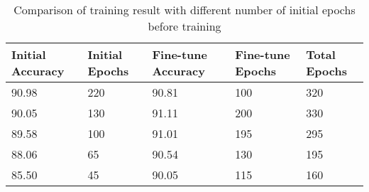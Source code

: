 \begin{table}[tb]
    \centering
    \caption{Comparison of training result with different number of initial epochs before training}
    \label{table:prune}
    \begin{tabular}{p{}p{}p{}p{}p{}}
    \hline
    Initial Accuracy & Initial Epochs & Fine-tune Accuracy & Fine-tune Epochs & Total Epochs \\ \hline
    90.98   & 220   & 90.81 & 100   & 320   \\
    90.05   & 130   & 91.11 & 200   & 330   \\
    89.58   & 100   & 91.01 & 195   & 295   \\
    88.06   & 65    & 90.54 & 130   & 195   \\
    85.50   & 45    & 90.05 & 115   & 160   \\\hline
    \end{tabular}
\end{table}
